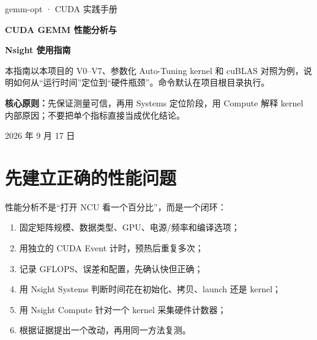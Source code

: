\documentclass[UTF8,11pt,a4paper,fontset=fandol]{ctexart}
\newcommand{\pagebreakhere}{\clearpage}
\begin{document}
\begin{titlepage}
\centering
\vspace*{1.2cm}
{\large\color{Blue}gemm-opt · CUDA 实践手册\par}
\vspace{0.8cm}
{\Huge\bfseries CUDA GEMM 性能分析与\par}
\vspace{0.25cm}
{\Huge\bfseries Nsight 使用指南\par}
\vspace{1.1cm}
\vfill
\begin{minipage}{0.84\linewidth}\large
本指南以本项目的 V0--V7、参数化 Auto-Tuning kernel 和 cuBLAS 对照为例，说明如何从“运行时间”定位到“硬件瓶颈”。命令默认在项目根目录执行。\par
\textbf{核心原则：}先保证测量可信，再用 Systems 定位阶段，用 Compute 解释 kernel 内部原因；不要把单个指标直接当成优化结论。
\end{minipage}
\vfill
{\large 2026 年 9 月 17 日\par}
\end{titlepage}

\tableofcontents
\pagebreakhere

\section{先建立正确的性能问题}
性能分析不是“打开 NCU 看一个百分比”，而是一个闭环：
\begin{enumerate}
  \item 固定矩阵规模、数据类型、GPU、电源/频率和编译选项；
  \item 用独立的 CUDA Event 计时，预热后重复多次；
  \item 记录 GFLOPS、误差和配置，先确认快但正确；
  \item 用 Nsight Systems 判断时间花在初始化、拷贝、launch 还是 kernel；
  \item 用 Nsight Compute 针对一个 kernel 采集硬件计数器；
  \item 根据证据提出一个改动，再用同一方法复测。
\end{enumerate}
\end{document}

